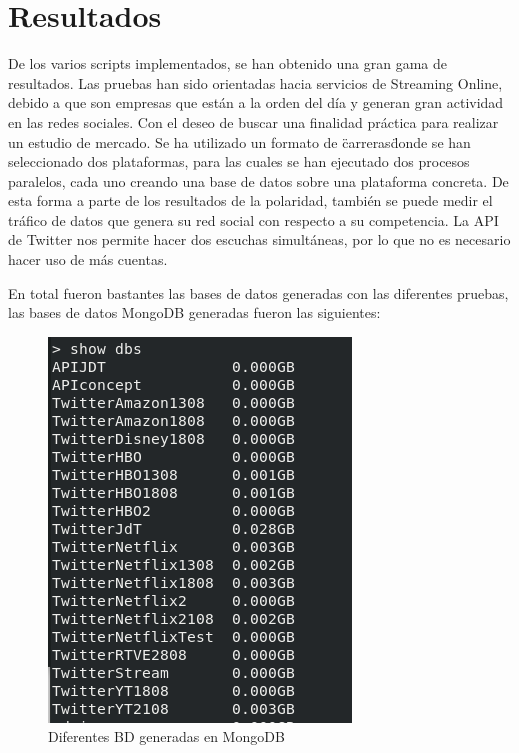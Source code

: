
\chapter{Resultados}

De los varios scripts implementados, se han obtenido una gran gama de resultados. Las pruebas han sido orientadas hacia servicios de Streaming Online, debido a que son empresas que están a la orden del día y generan gran actividad en las redes sociales. Con el deseo de buscar una finalidad práctica para realizar un estudio de mercado. Se ha utilizado un formato de \"carreras\" donde se han seleccionado dos plataformas, para las cuales se han ejecutado dos procesos paralelos, cada uno creando una base de datos sobre una plataforma concreta. De esta forma a parte de los resultados de la polaridad, también se puede medir el tráfico de datos que genera su red social con respecto a su competencia. La API de Twitter nos permite hacer dos escuchas simultáneas, por lo que no es necesario hacer uso de más cuentas. 

En total fueron bastantes las bases de datos generadas con las diferentes pruebas, las bases de datos MongoDB generadas fueron las siguientes:


\begin{figure}[H]
	\centering
	\includegraphics[scale=.5]{imagenes/BD-Mongo.png}
	\caption{Diferentes BD generadas en MongoDB}
	\label{fig:BD-MongoDB}
\end{figure}


